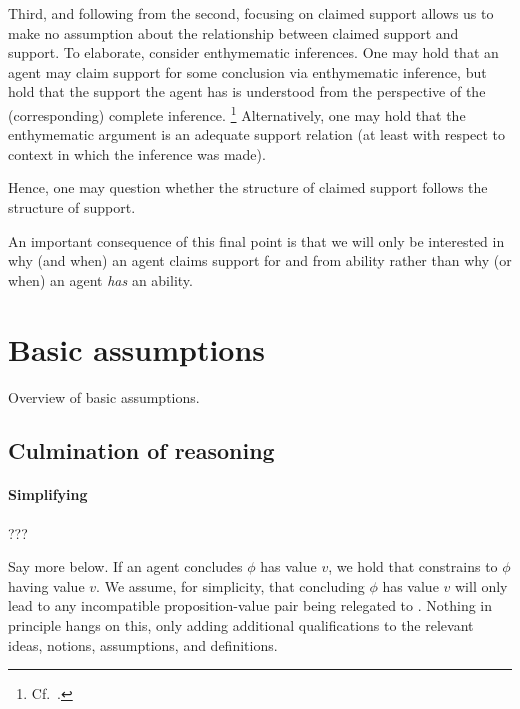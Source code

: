\begin{note}
  Third, and following from the second, focusing on claimed support allows us to make no assumption about the relationship between claimed support and support.
  To elaborate, consider enthymematic inferences.
  One may hold that an agent may claim support for some conclusion via enthymematic inference, but hold that the support the agent has is understood from the perspective of the (corresponding) complete inference.\nolinebreak
  \footnote{
    Cf.\ \textcite{Moretti:2019wx}.
  }
  Alternatively, one may hold that the enthymematic argument is an adequate support relation (at least with respect to context in which the inference was made).

  Hence, one may question whether the structure of claimed support follows the structure of support.

  An important consequence of this final point is that we will only be interested in why (and when) an agent claims support for and from ability rather than why (or when) an agent \emph{has} an ability.
\end{note}

\section{Basic assumptions}
\label{sec:basic-assumptions}

\begin{note}
  Overview of basic assumptions.
\end{note}

\subsection{Culmination of reasoning}
\label{sec:basic-assumptions:culmination-of-reasoning}


\paragraph{Simplifying}

\begin{assumption}
  \label{assu:simplifying:epPAlways}
  ???
\end{assumption}

\begin{note}
  Say more below.
  If an agent concludes \(\phi\) has value \(v\), we hold that constrains  to \(\phi\) having value \(v\).
  We assume, for simplicity, that concluding \(\phi\) has value \(v\) will only lead to any incompatible proposition-value pair being relegated to \epPAd{}.
  Nothing in principle hangs on this, only adding additional qualifications to the relevant ideas, notions, assumptions, and definitions.
\end{note}

